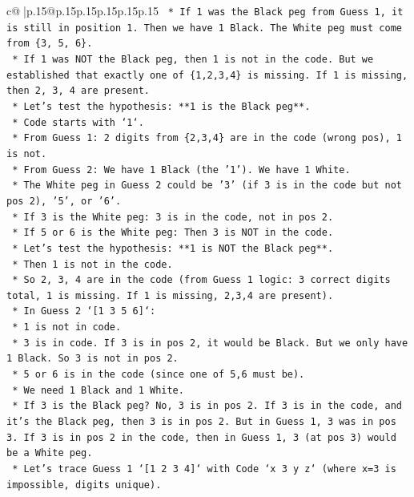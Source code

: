 \documentclass{article}
\begin{document}
{\begin{supertabular}{c@{$\;$}|p{.15\linewidth}@{}p{.15\linewidth}p{.15\linewidth}p{.15\linewidth}p{.15\linewidth}p{.15\linewidth}}
{{{\texttt{    *   If 1 was the Black peg from Guess 1, it is still in position 1. Then we have 1 Black. The White peg must come from \{3, 5, 6\}.} \\
\texttt{    *   If 1 was NOT the Black peg, then 1 is not in the code. But we established that exactly one of \{1,2,3,4\} is missing. If 1 is missing, then 2, 3, 4 are present.} \\
\texttt{    *   Let's test the hypothesis: **1 is the Black peg**.} \\
\texttt{        *   Code starts with `1`.} \\
\texttt{        *   From Guess 1: 2 digits from \{2,3,4\} are in the code (wrong pos), 1 is not.} \\
\texttt{        *   From Guess 2: We have 1 Black (the '1'). We have 1 White.} \\
\texttt{        *   The White peg in Guess 2 could be '3' (if 3 is in the code but not pos 2), '5', or '6'.} \\
\texttt{        *   If 3 is the White peg: 3 is in the code, not in pos 2.} \\
\texttt{        *   If 5 or 6 is the White peg: Then 3 is NOT in the code.} \\
\texttt{    *   Let's test the hypothesis: **1 is NOT the Black peg**.} \\
\texttt{        *   Then 1 is not in the code.} \\
\texttt{        *   So 2, 3, 4 are in the code (from Guess 1 logic: 3 correct digits total, 1 is missing. If 1 is missing, 2,3,4 are present).} \\
\texttt{        *   In Guess 2 `{[}1 3 5 6{]}`:} \\
\texttt{            *   1 is not in code.} \\
\texttt{            *   3 is in code. If 3 is in pos 2, it would be Black. But we only have 1 Black. So 3 is not in pos 2.} \\
\texttt{            *   5 or 6 is in the code (since one of 5,6 must be).} \\
\texttt{            *   We need 1 Black and 1 White.} \\
\texttt{            *   If 3 is the Black peg? No, 3 is in pos 2. If 3 is in the code, and it's the Black peg, then 3 is in pos 2. But in Guess 1, 3 was in pos 3. If 3 is in pos 2 in the code, then in Guess 1, 3 (at pos 3) would be a White peg.} \\
\texttt{            *   Let's trace Guess 1 `{[}1 2 3 4{]}` with Code `x 3 y z` (where x=3 is impossible, digits unique).} \\
}}}
\end{supertabular}}
\end{document}
